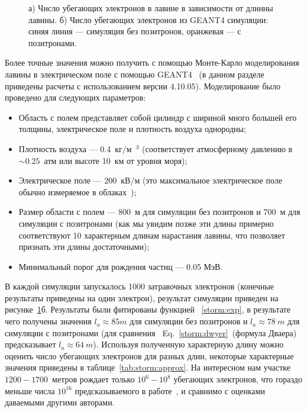 \begin{figure}[t]
    \begin{center}
        \begin{minipage}[h]{0.49\linewidth}
        \end{minipage}
        \hfill
        \begin{minipage}[h]{0.49\linewidth}
        \end{minipage}
        \caption{  а) Число убегающих электронов в лавине в зависимости от длинны лавины. б) Число убегающих электронов из GEANT4 симуляции: синяя линия --- симуляция без позитронов, оранжевая --- с позитронами.}
    \end{center}
    \label{storm:number_runway}
\end{figure}
Более точные значения можно получить с помощью Монте-Карло моделирования лавины в электрическом поле с помощью GEANT4~\cite{Geant2003,Geant2006, Geant2016} (в данном разделе приведены расчеты с использованием версии 4.10.05).
Моделирование было проведено для следующих параметров: 
\begin{itemize}
    \item Область с полем представляет собой  цилиндр с шириной много большей его толщины, электрическое поле и плотность воздуха однородны;
    \item Плотность воздуха --- 0.4~кг/м~$^3$ (соответствует атмосферному давлению в  $\sim 0.25$~атм или высоте 10~км от уровня моря);
    \item Электрическое поле --- $200$~кВ/м (это максимальное электрическое поле обычно измеряемое в облаках~\cite{rakov_uman});
    \item Размер области с полем --- $800$~м для симуляции без позитронов и $700$~м для симуляции с позитронами (как мы увидим позже эти длины примерно соответствуют 10 характерным длинам нарастания лавины, что позволяет признать эти длины достаточными);
    \item Минимальный порог для рождения частиц --- 0.05 МэВ.
\end{itemize}
В каждой симуляции запускалось 1000 затравочных электронов (конечные результаты приведены на один электрон), результат симуляции приведен на рисунке~\ref{storm:number_runway}б. Результаты были фитированы функцией ~\ref{storm:exp}, в результате чего получены значения  $l_a \approx 85 m$ для симуляции без позитронов и $l_a \approx 78~m$ для симуляции с позитронами (для сравнения ~Eq.~\ref{storm:dwyer}~(формула Дваера) предсказывает $l_a \approx 64~m$). Используя полученную характерную длину можно оценить число убегающих электронов для разных длин, некоторые характерные значения приведены в таблице~\ref{tab:storm:approx}. На интересном нам участке $1200 - 1700$~метров рождает только $10^6-10^8$ убегающих электронов, что гораздо меньше числа $10^{16}$ предсказываемого в работе~\cite{Oreshkin_2018}, и сравнимо с оценками даваемыми другими авторами.
